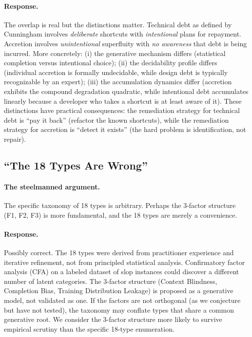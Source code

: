 \documentclass[11pt, a4paper, copyright]{googledeepmind}
\begin{document}
\paragraph{Response.} The overlap is real but the distinctions matter. Technical debt as defined by Cunningham \citep{cunningham1992} involves \emph{deliberate} shortcuts with \emph{intentional} plans for repayment. Accretion involves \emph{unintentional} superfluity with \emph{no awareness} that debt is being incurred. More concretely: (i) the generative mechanism differs (statistical completion versus intentional choice); (ii) the decidability profile differs (individual accretion is formally undecidable, while design debt is typically recognizable by an expert); (iii) the accumulation dynamics differ (accretion exhibits the compound degradation quadratic, while intentional debt accumulates linearly because a developer who takes a shortcut is at least aware of it). These distinctions have practical consequences: the remediation strategy for technical debt is ``pay it back'' (refactor the known shortcuts), while the remediation strategy for accretion is ``detect it exists'' (the hard problem is identification, not repair).

\subsection{``The 18 Types Are Wrong''}

\paragraph{The steelmanned argument.} The specific taxonomy of 18 types is arbitrary. Perhaps the 3-factor structure (F1, F2, F3) is more fundamental, and the 18 types are merely a convenience.

\paragraph{Response.} Possibly correct. The 18 types were derived from practitioner experience and iterative refinement, not from principled statistical analysis. Confirmatory factor analysis (CFA) on a labeled dataset of slop instances could discover a different number of latent categories. The 3-factor structure (Context Blindness, Completion Bias, Training Distribution Leakage) is proposed as a generative model, not validated as one. If the factors are not orthogonal (as we conjecture but have not tested), the taxonomy may conflate types that share a common generative root. We consider the 3-factor structure more likely to survive empirical scrutiny than the specific 18-type enumeration.
\end{document}
